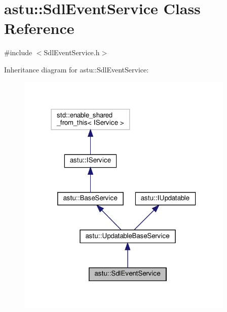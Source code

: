 \hypertarget{classastu_1_1SdlEventService}{}\section{astu\+:\+:Sdl\+Event\+Service Class Reference}
\label{classastu_1_1SdlEventService}


{\ttfamily \#include $<$Sdl\+Event\+Service.\+h$>$}



Inheritance diagram for astu\+:\+:Sdl\+Event\+Service\+:\nopagebreak
\begin{figure}[H]
\begin{center}
\leavevmode
\includegraphics[width=294pt]{classastu_1_1SdlEventService__inherit__graph}
\end{center}
\end{figure}


